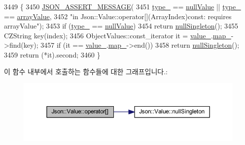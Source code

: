 \begin{DoxyCode}
3449                                                      \{
3450   \hyperlink{json_8h_ad7facdeeca0f495765e3b204c265eadb}{JSON\_ASSERT\_MESSAGE}(
3451       \hyperlink{class_json_1_1_value_abd222c2536dc88bf330dedcd076d2356}{type\_} == \hyperlink{namespace_json_a7d654b75c16a57007925868e38212b4ea7d9899633b4409bd3fc107e6737f8391}{nullValue} || \hyperlink{class_json_1_1_value_abd222c2536dc88bf330dedcd076d2356}{type\_} == \hyperlink{namespace_json_a7d654b75c16a57007925868e38212b4eadc8f264f36b55b063c78126b335415f4}{arrayValue},
3452       \textcolor{stringliteral}{"in Json::Value::operator[](ArrayIndex)const: requires arrayValue"});
3453   \textcolor{keywordflow}{if} (\hyperlink{class_json_1_1_value_abd222c2536dc88bf330dedcd076d2356}{type\_} == \hyperlink{namespace_json_a7d654b75c16a57007925868e38212b4ea7d9899633b4409bd3fc107e6737f8391}{nullValue})
3454     \textcolor{keywordflow}{return} \hyperlink{class_json_1_1_value_af2f124567acc35d021a424e53ebdfcab}{nullSingleton}();
3455   CZString key(index);
3456   ObjectValues::const\_iterator it = \hyperlink{class_json_1_1_value_aef578244546212705b9f81eb84d7e151}{value\_}.\hyperlink{union_json_1_1_value_1_1_value_holder_a1e7a5b86d4f52234f55c847ad1ce389a}{map\_}->find(key);
3457   \textcolor{keywordflow}{if} (it == \hyperlink{class_json_1_1_value_aef578244546212705b9f81eb84d7e151}{value\_}.\hyperlink{union_json_1_1_value_1_1_value_holder_a1e7a5b86d4f52234f55c847ad1ce389a}{map\_}->end())
3458     \textcolor{keywordflow}{return} \hyperlink{class_json_1_1_value_af2f124567acc35d021a424e53ebdfcab}{nullSingleton}();
3459   \textcolor{keywordflow}{return} (*it).second;
3460 \}
\end{DoxyCode}
이 함수 내부에서 호출하는 함수들에 대한 그래프입니다.\+:\nopagebreak
\begin{figure}[H]
\begin{center}
\leavevmode
\includegraphics[width=350pt]{class_json_1_1_value_a46607236038b29695ed80c15895271e4_cgraph}
\end{center}
\end{figure}
\mbox{\label{class_json_1_1_value_a0b42557a95621a4676b46a21ffc5e949}} 

